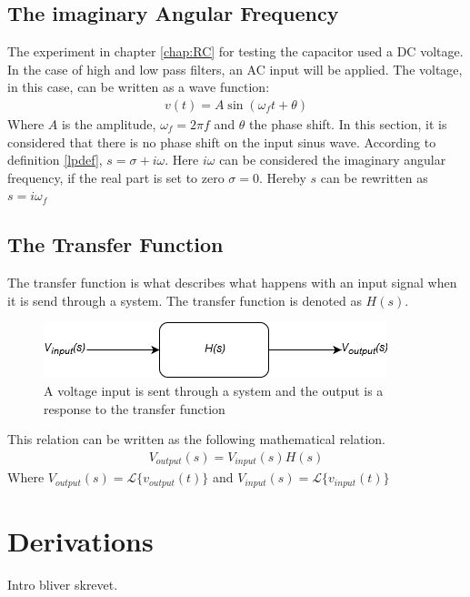 \subsection{The imaginary Angular Frequency}
The experiment in chapter \ref{chap:RC} for testing the capacitor used a DC voltage. In the case of high and low pass filters, an AC input will be applied. The voltage, in this case, can be written as a wave function:
\begin{align}
v(t)=A\sin(\omega_f t+\theta)
\end{align}
Where $A$ is the amplitude, $\omega_f=2\pi f$ and $\theta$ the phase shift. In this section, it is considered that there is no phase shift on the input sinus wave. According to definition \ref{lpdef}, $s=\sigma + i \omega$. Here $i \omega$ can be considered the imaginary angular frequency, if the real part is set to zero $\sigma = 0$. Hereby $s$ can be rewritten as $s = i \omega_f$ \cite[p. 733 - 735]{bcircuit9}
\subsection{The Transfer Function}
The transfer function is what describes what happens with an input signal when it is send through a system. The transfer function is denoted as $H(s)$.
\\
\begin{figure}[H]
\center
\includegraphics[scale=0.6]{fig/img/transfer_function.png}
\caption{A voltage input is sent through a system and the output is a response to the transfer function}
\label{fig:transfer}
\end{figure}
\noindent
This relation can be written as the following mathematical relation.
\begin{align}
V_{output}(s)=V_{input}(s)H(s)
\end{align}
Where $V_{output}(s)=\mathcal{L}\{v_{output}(t)\}$ and $V_{input}(s)=\mathcal{L}\{v_{input}(t)\}$
\section{Derivations} \label{Derivations}
Intro bliver skrevet.
